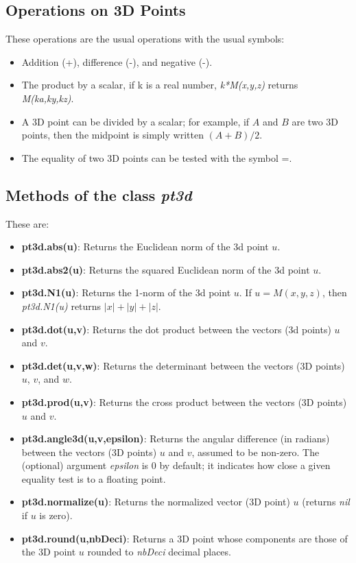 \subsection{Operations on 3D Points}

These operations are the usual operations with the usual symbols:
\begin{itemize}
    \item Addition (+), difference (-), and negative (-).
    \item The product by a scalar, if k is a real number, \emph{k*M(x,y,z)} returns \emph{M(ka,ky,kz)}.
    \item A 3D point can be divided by a scalar; for example, if $A$ and $B$ are two 3D points, then the midpoint is simply written $(A+B)/2$.
    \item The equality of two 3D points can be tested with the symbol =.
\end{itemize}

\subsection{Methods of the class \emph{pt3d}}

These are:
\begin{itemize}
    \item \textbf{pt3d.abs(u)}: Returns the Euclidean norm of the 3d point $u$.
    \item \textbf{pt3d.abs2(u)}: Returns the squared Euclidean norm of the 3d point $u$.
    \item \textbf{pt3d.N1(u)}: Returns the 1-norm of the 3d point $u$. If $u=M(x,y,z)$, then \emph{pt3d.N1(u)} returns $|x|+|y|+|z|$.
    \item \textbf{pt3d.dot(u,v)}: Returns the dot product between the vectors (3d points) $u$ and $v$.
    \item \textbf{pt3d.det(u,v,w)}: Returns the determinant between the vectors (3D points) $u$, $v$, and $w$.
    \item \textbf{pt3d.prod(u,v)}: Returns the cross product between the vectors (3D points) $u$ and $v$.
    \item \textbf{pt3d.angle3d(u,v,epsilon)}: Returns the angular difference (in radians) between the vectors (3D points) $u$ and $v$, assumed to be non-zero. The (optional) argument \emph{epsilon} is $0$ by default; it indicates how close a given equality test is to a floating point.

    \item \textbf{pt3d.normalize(u)}: Returns the normalized vector (3D point) $u$ (returns \emph{nil} if $u$ is zero).
    \item \textbf{pt3d.round(u,nbDeci)}: Returns a 3D point whose components are those of the 3D point $u$ rounded to \emph{nbDeci} decimal places.
\end{itemize}

